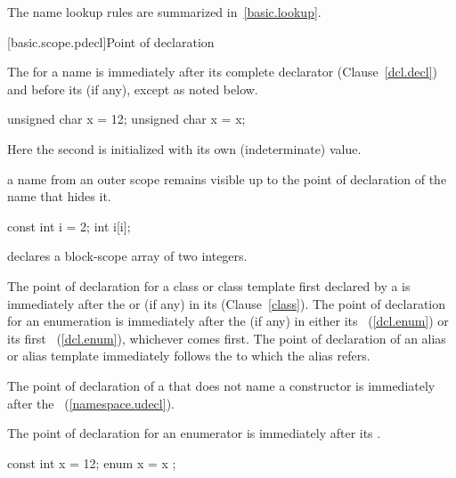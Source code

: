 \pnum
\enternote The name lookup rules are summarized in~\ref{basic.lookup}.
\exitnote

[basic.scope.pdecl]{Point of declaration}

\pnum
{}%
The  for a name is immediately after its
complete declarator (Clause~\ref{dcl.decl}) and before its
 (if any), except as noted below. \enterexample

\begin{codeblock}
unsigned char x = 12;
{ unsigned char x = x; }
\end{codeblock}

Here the second  is initialized with its own (indeterminate)
value. \exitexample

\pnum
\enternote 
{}%
a name from an outer scope remains visible up
to the point of declaration of the name that hides it.\enterexample

\begin{codeblock}
const int  i = 2;
{ int  i[i]; }
\end{codeblock}

declares a block-scope array of two integers. \exitexample \exitnote

\pnum
The point of declaration for a class or class template first declared by a
 is immediately after the  or
 (if any) in its 
(Clause~\ref{class}). The point of declaration for an enumeration is
immediately after the  (if any) in either its
~(\ref{dcl.enum}) or its first
~(\ref{dcl.enum}), whichever comes first.
The point of declaration of an alias or alias template immediately
follows the  to which the
alias refers.

\pnum
The point of declaration of a  that does not name a
constructor is immediately after the ~(\ref{namespace.udecl}).

\pnum
{}%
The point of declaration for an enumerator is immediately after its
.\enterexample

\begin{codeblock}
const int x = 12;
{ enum { x = x }; }
\end{codeblock}

